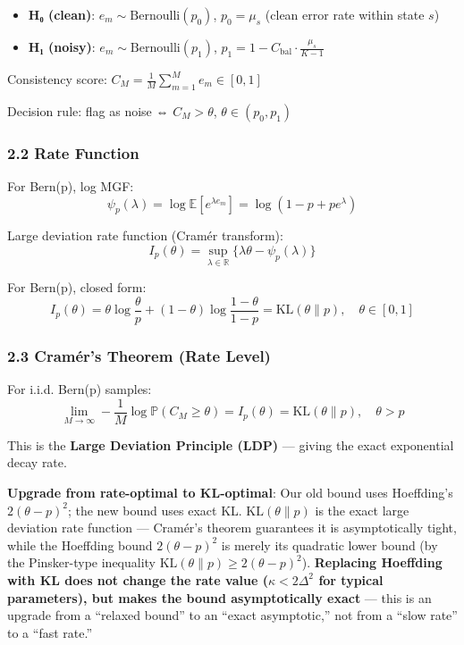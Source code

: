 \documentclass[
  12pt,
]{article}
\providecommand{\tightlist}{%
  \setlength{\itemsep}{0pt}\setlength{\parskip}{0pt}}
\begin{document}
\begin{itemize}
\tightlist
\item
  \textbf{H₀ (clean)}: \(e_m \sim \text{Bernoulli}(p_0)\), \(p_0 = \mu_s\) (clean error rate within state \(s\))
\item
  \textbf{H₁ (noisy)}: \(e_m \sim \text{Bernoulli}(p_1)\), \(p_1 = 1 - C_{\text{bal}} \cdot \frac{\mu_s}{K-1}\)
\end{itemize}

Consistency score: \(C_M = \frac{1}{M}\sum_{m=1}^M e_m \in [0,1]\)

Decision rule: flag as noise ⇔ \(C_M > \theta\), \(\theta \in (p_0, p_1)\)

\subsubsection{2.2 Rate Function}\label{rate-function}

For Bern(p), log MGF:
\[\psi_p(\lambda) = \log \mathbb{E}[e^{\lambda e_m}] = \log(1 - p + pe^\lambda)\]

Large deviation rate function (Cramér transform):
\[I_p(\theta) = \sup_{\lambda \in \mathbb{R}} \{\lambda\theta - \psi_p(\lambda)\}\]

For Bern(p), closed form:
\[I_p(\theta) = \theta \log\frac{\theta}{p} + (1-\theta)\log\frac{1-\theta}{1-p} = \text{KL}(\theta \| p), \quad \theta \in [0,1]\]

\subsubsection{2.3 Cramér's Theorem (Rate Level)}\label{cramers-theorem-rate-level}

For i.i.d. Bern(p) samples:
\[\lim_{M\to\infty} -\frac{1}{M}\log \mathbb{P}(C_M \geq \theta) = I_p(\theta) = \text{KL}(\theta \| p), \quad \theta > p\]

This is the \textbf{Large Deviation Principle (LDP)} — giving the exact exponential decay rate.

\textbf{Upgrade from rate-optimal to KL-optimal}: Our old bound uses Hoeffding's \(2(\theta-p)^2\); the new bound uses exact KL. \(\text{KL}(\theta\|p)\) is the exact large deviation rate function — Cramér's theorem guarantees it is asymptotically tight, while the Hoeffding bound \(2(\theta-p)^2\) is merely its quadratic lower bound (by the Pinsker-type inequality \(\text{KL}(\theta\|p) \geq 2(\theta-p)^2\)). \textbf{Replacing Hoeffding with KL does not change the rate value (\(\kappa < 2\Delta^2\) for typical parameters), but makes the bound asymptotically exact} — this is an upgrade from a ``relaxed bound'' to an ``exact asymptotic,'' not from a ``slow rate'' to a ``fast rate.''
\end{document}
